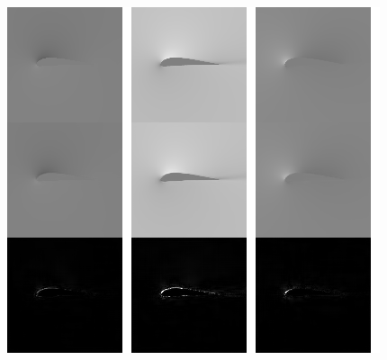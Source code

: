 \begin{frame}
\begin{multicols}{2}
    \includegraphics[width=.9\columnwidth, height=.6\textheight]{./Ressourcen/Praesentation/Bilder/TransferEval/std/0084_bw.png}%
\end{multicols}
    
\end{frame}
\clearpage

